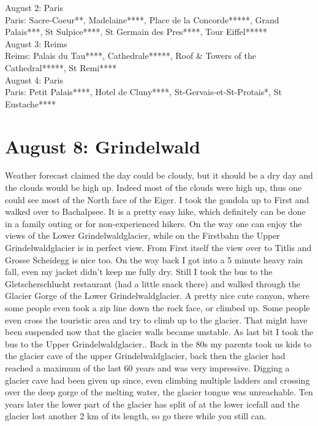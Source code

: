 August 2: Paris\\
Paris: Sacre-Coeur**, Madelaine****, Place de la Concorde*****, Grand Palais***,  St Sulpice****, St Germain des Pres****, Tour Eiffel*****\\

August 3: Reims\\
Reims: Palais du Tau****, Cathedrale*****, Roof \& Towers of the Cathedral*****, St Remi****\\

August 4: Paris\\
Paris: Petit Palais****, Hotel de Cluny****, St-Gervais-et-St-Protais*, St Eustache****

\section{August 8: Grindelwald}
\label{2010Grindelwald}

Weather forecast claimed the day could be cloudy, but it should be a dry day and the clouds would be high up. Indeed most of the clouds were high up, thus one could see most of the North face of the Eiger. I took the gondola up to First and walked over to Bachalpsee. It is a pretty easy hike, which definitely can be done in a family outing or for non-experienced hikers. On the way one can enjoy the views of the Lower Grindelwaldglacier, while on the Firstbahn the Upper Grindelwaldglacier is in perfect view. From First itself the view over to Titlis and Grosse Scheidegg is nice too. On the way back I got into a 5 minute heavy rain fall, even my jacket didn't keep me fully dry. Still I took the bus to the Gletscherschlucht restaurant (had a little snack there) and walked through the Glacier Gorge of the Lower Grindelwaldglacier. A pretty nice cute canyon, where some people even took a zip line down the rock face, or climbed up. Some people even cross the touristic area and try to climb up to the glacier. That might have been suspended now that the glacier walls became unstable. As last bit I took the bus to the Upper Grindelwaldglacier.. Back in the 80s my parents took us kids to the glacier cave of the upper Grindelwaldglacier, back then the glacier had reached a maximum of the last 60 years and was very impressive. Digging a glacier cave had been given up since, even climbing multiple ladders and crossing over the deep gorge of the melting water, the glacier tongue was unreachable. Ten years later the lower part of the glacier has split of at the lower icefall and the glacier lost another 2 km of its length, so go there while you still can.\\

